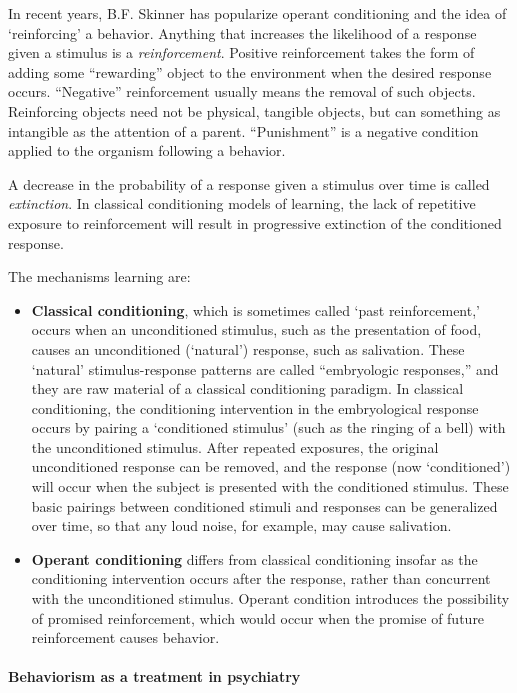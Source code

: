 In recent years, B.F. Skinner has popularize operant conditioning and the idea of `reinforcing' a behavior. Anything that increases the likelihood of a response given a stimulus is a \emph{reinforcement}. Positive reinforcement takes the form of adding some ``rewarding'' object to the environment when the desired response occurs. ``Negative'' reinforcement usually means the removal of such objects. Reinforcing objects need not be physical, tangible objects, but can something as intangible as the attention of a parent. ``Punishment'' is a negative condition applied to the organism following a behavior.

A decrease in the probability of a response given a stimulus over time is called \emph{extinction}. In classical conditioning models of learning, the lack of repetitive exposure to reinforcement will result in progressive extinction of the conditioned response.

The mechanisms learning are:

\begin{itemize}
\item \textbf{Classical conditioning}, which is sometimes called `past reinforcement,' occurs when an unconditioned stimulus, such as the presentation of food, causes an unconditioned (`natural') response, such as salivation. These `natural' stimulus-response patterns are called ``embryologic responses,'' and they are raw material of a classical conditioning paradigm. In classical conditioning, the conditioning intervention in the embryological response occurs by pairing a `conditioned stimulus' (such as the ringing of a bell) with the unconditioned stimulus. After repeated exposures, the original unconditioned response can be removed, and the response (now `conditioned') will occur when the subject is presented with the conditioned stimulus. These basic pairings between conditioned stimuli and responses can be generalized over time, so that any loud noise, for example, may cause salivation. 

\item \textbf{Operant conditioning} differs from classical conditioning insofar as the conditioning intervention occurs after the response, rather than concurrent with the unconditioned stimulus. Operant condition introduces the possibility of promised reinforcement, which would occur when the promise of future reinforcement causes behavior.

\end{itemize}

\paragraph{Behaviorism as a treatment in psychiatry}
\label{behaviorismasatreatmentinpsychiatry}

